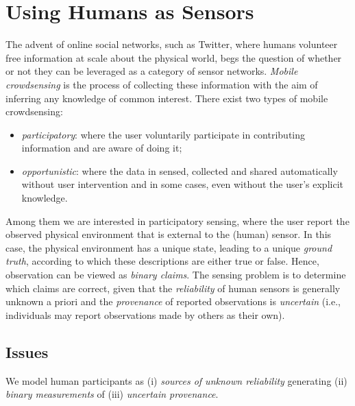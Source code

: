 \documentclass[a4paper,12pt]{article}
\begin{document}
\section{Using Humans as Sensors}
The advent of online social networks, such as Twitter, where humans volunteer free information at scale about the physical world, begs the question of whether or not they can be leveraged as a category of sensor networks. \textit{Mobile crowdsensing} is the process of collecting these information with the aim of inferring any knowledge of common interest.
There exist two types of mobile crowdsensing:
\begin{itemize}
	\item \textit{participatory}: where the user voluntarily participate in contributing information and are aware of doing it;
	\item \textit{opportunistic}: where the data in sensed, collected and shared automatically without user intervention and in some cases, even without the user's explicit knowledge.
\end{itemize}

Among them we are interested in participatory sensing, where the user report the observed physical environment that is external to the (human) sensor. In this case, the physical environment has a unique state, leading to a unique \textit{ground truth}, according to which these descriptions are either true or false. Hence, observation can be viewed as \textit{binary claims}. The sensing problem is to determine which claims are correct, given that the \textit{reliability} of human sensors is generally unknown a priori and the \textit{provenance} of reported observations is \textit{uncertain} (i.e., individuals may report observations made by others as their own).

\subsection{Issues}

We model human participants as (i) \textit{sources of unknown reliability} generating (ii) \textit{binary measurements} of (iii) \textit{uncertain provenance}.
\end{document}
